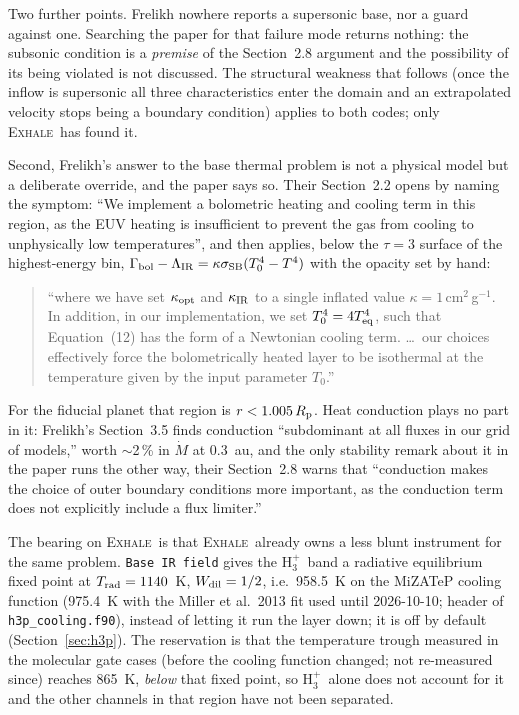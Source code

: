 \documentclass[english,a4paper]{my_memo}
\newcommand{\Rp}{R_{\rm p}}
\newcommand{\Mdot}{\dot{M}}
\newcommand{\EXHALE}{\textsc{Exhale}}
\newcommand{\Hth}{\ensuremath{\mathrm{H}_3^+}}
\begin{document}
Two further points. Frelikh nowhere reports a supersonic base, nor a guard
against one. Searching the paper for that failure mode returns nothing: the
subsonic condition is a \emph{premise} of the Section~2.8 argument and the
possibility of its being violated is not discussed. The structural weakness
that follows (once the inflow is supersonic all three characteristics enter
the domain and an extrapolated velocity stops being a boundary condition)
applies to both codes; only \EXHALE\ has found it.

Second, Frelikh's answer to the base thermal problem is not a physical model
but a deliberate override, and the paper says so. Their Section~2.2 opens by
naming the symptom: ``We implement a bolometric heating and cooling term in
this region, as the EUV heating is insufficient to prevent the gas from
cooling to unphysically low temperatures'', and then applies, below the
$\tau = 3$ surface of the highest-energy bin,
$\Gamma_{\rm bol} - \Lambda_{\rm IR} = \kappa\sigma_{\rm SB}(T_0^4 - T^4)$
with the opacity set by hand:
\begin{quote}\small
``where we have set $\kappa_{\rm opt}$ and $\kappa_{\rm IR}$ to a single
inflated value $\kappa = 1$\,cm$^2$\,g$^{-1}$. In addition, in our
implementation, we set $T_0^4 = 4T_{\rm eq}^4$, such that Equation~(12) has
the form of a Newtonian cooling term. \ldots\ our choices effectively force
the bolometrically heated layer to be isothermal at the temperature given by
the input parameter $T_0$.''
\end{quote}
For the fiducial planet that region is $r < 1.005\,\Rp$. Heat conduction plays
no part in it: Frelikh's Section~3.5 finds conduction ``subdominant at all
fluxes in our grid of models,'' worth $\sim$2\,\% in $\Mdot$ at 0.3~au, and
the only stability remark about it in the paper runs the other way, their
Section~2.8 warns that ``conduction makes the choice of outer boundary
conditions more important, as the conduction term does not explicitly include
a flux limiter.''

The bearing on \EXHALE\ is that \EXHALE\ already owns a less blunt instrument
for the same problem. \texttt{Base IR field} gives the \Hth\ band a radiative
equilibrium fixed point at $T_{\rm rad} = 1140$~K, $W_{\rm dil} = 1/2$, i.e.\
958.5~K on the MiZATeP cooling function (975.4~K with the Miller et al.\ 2013
fit used until 2026-10-10; header of \texttt{h3p\_cooling.f90}), instead of
letting it run the layer down; it is off by default
(Section~\ref{sec:h3p}). The reservation is that the temperature trough
measured in the molecular gate cases (before the cooling function changed;
not re-measured since) reaches 865~K, \emph{below} that fixed
point, so \Hth\ alone does not account for it and the other channels in that
region have not been separated.
\end{document}
